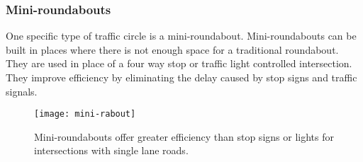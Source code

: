 \clearpage

\subsubsection{Mini-roundabouts}
One specific type of traffic circle is a mini-roundabout.  Mini-roundabouts can be built in places where there is not enough space for a traditional roundabout.  They are used in place of a four way stop or traffic light controlled intersection.  They improve efficiency by eliminating the delay caused by stop signs and traffic signals.

\begin{figure}[!htbp]
\centering
\texttt{[image: mini-rabout]}
\caption[Mini-Roundabout]{Mini-roundabouts offer greater efficiency than stop signs or lights for intersections with single lane roads.}\label{fig:mini-rabout}
\end{figure}

